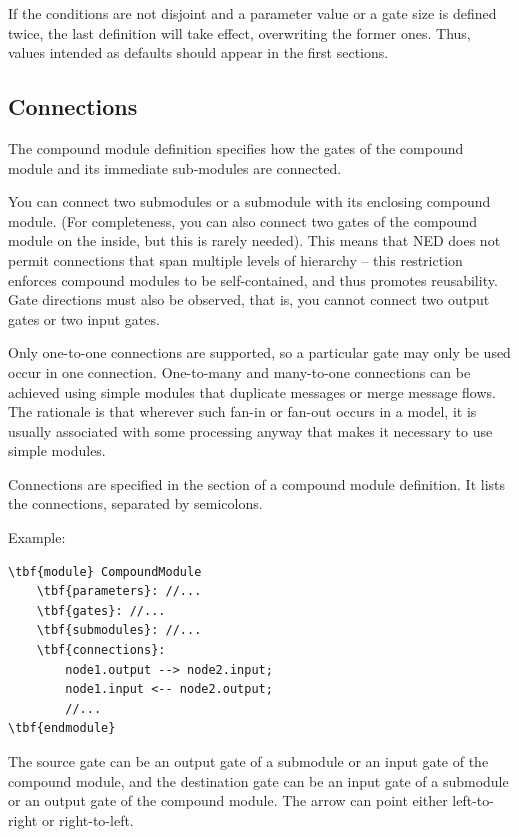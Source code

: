 If the conditions are not disjoint and a parameter value or a
gate size is defined twice, the last definition will take effect,
overwriting the former ones. Thus, values intended as defaults
should appear in the first sections.



\subsection{Connections}


The compound module definition specifies how the gates of the compound
module and its immediate sub-modules are connected.

You can connect two submodules or a submodule with its enclosing
compound module. (For completeness, you can also connect two gates
of the compound module on the inside, but this is rarely needed).
This means that NED does not permit connections that span
multiple levels of hierarchy -- this restriction
enforces compound modules to be self-contained, and thus promotes
reusability. Gate directions must also be observed,
that is, you cannot connect two output gates or two input gates.

Only one-to-one connections are supported, so a particular gate may only
be used occur in one connection. One-to-many and many-to-one
connections can be achieved using simple modules that duplicate
messages or merge message flows. The rationale is that wherever
such fan-in or fan-out occurs in a model, it is usually associated
with some processing anyway that makes it necessary to use
simple modules.

Connections are specified in the
 section of a compound
module definition. It lists the connections, separated by semicolons.

Example:

\begin{Verbatim}[commandchars=\\\{\}]
\tbf{module} CompoundModule
    \tbf{parameters}: //...
    \tbf{gates}: //...
    \tbf{submodules}: //...
    \tbf{connections}:
        node1.output --> node2.input;
        node1.input <-- node2.output;
        //...
\tbf{endmodule}
\end{Verbatim}

The source gate can be an output gate of a submodule or an input
gate of the compound module, and the destination gate can be
an input gate of a submodule or an output gate of the compound
module. The arrow can point either left-to-right or right-to-left.

